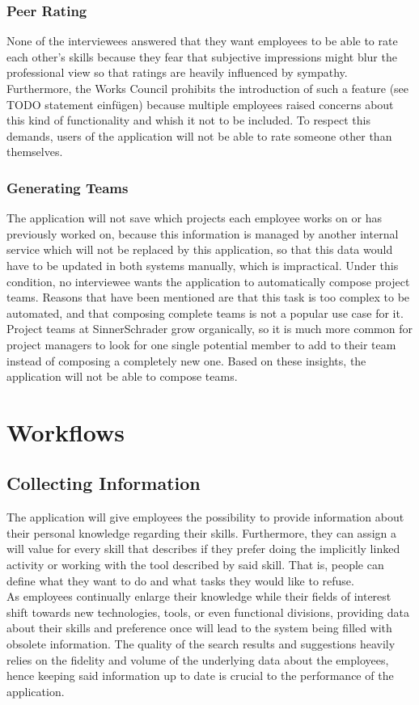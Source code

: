 \subsubsection{Peer Rating}
None of the interviewees answered that they want employees to be able to rate each other's skills because they fear that subjective impressions might blur the professional view so that ratings are heavily influenced by sympathy. Furthermore, the Works Council prohibits the introduction of such a feature (see TODO statement einfügen) because multiple employees raised concerns about this kind of functionality and whish it not to be included. To respect this demands, users of the application will not be able to rate someone other than themselves.

\subsubsection{Generating Teams}
The application will not save which projects each employee works on or has previously worked on, because this information is managed by another internal service which will not be replaced by this application, so that this data would have to be updated in both systems manually, which is impractical. Under this condition, no interviewee wants the application to automatically compose project teams. Reasons that have been mentioned are that this task is too complex to be automated, and that composing complete teams is not a popular use case for it. Project teams at SinnerSchrader grow organically, so it is much more common for project managers to look for one single potential member to add to their team instead of composing a completely new one. Based on these insights, the application will not be able to compose teams.

\section{Workflows}

\subsection{Collecting Information}
The application will give employees the possibility to provide information about their personal knowledge regarding their skills.
Furthermore, they can assign a will value for every skill that describes if they prefer
doing the implicitly linked activity or working with the tool described by said skill. That is, people can define what they want to do and what tasks they would like to refuse.\\
As employees continually enlarge their knowledge while their fields of interest shift towards new technologies, tools, or even
functional divisions, providing data about their skills and preference once will lead to the system being filled with obsolete
information. The quality of the search results and suggestions heavily relies on the fidelity and volume of the underlying data about the employees, hence keeping said information up to date is crucial to the performance of the application.

